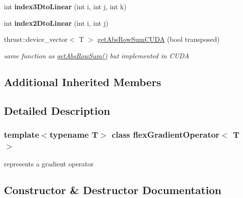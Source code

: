 \begin{DoxyCompactItemize}
\mbox{\label{classflex_gradient_operator_add0b4fb2eed25bc6386abd8219e516ff}} 
int {\bfseries index3\+Dto\+Linear} (int i, int j, int k)
\item 
\mbox{\label{classflex_gradient_operator_a3dcfa503fb5b55b1c9629399bfb79c0d}} 
int {\bfseries index2\+Dto\+Linear} (int i, int j)
\item 
thrust\+::device\+\_\+vector$<$ T $>$ \hyperlink{classflex_gradient_operator_ac5cf151db87946ac0f1864344db260d5}{get\+Abs\+Row\+Sum\+C\+U\+DA} (bool transposed)
\begin{DoxyCompactList}\small\item\em same function as \hyperlink{classflex_gradient_operator_a04950a1e57f7587b95824bfd82b35738}{get\+Abs\+Row\+Sum()} but implemented in C\+U\+DA \end{DoxyCompactList}\end{DoxyCompactItemize}
\subsection*{Additional Inherited Members}


\subsection{Detailed Description}
\subsubsection*{template$<$typename T$>$\newline
class flex\+Gradient\+Operator$<$ T $>$}

represents a gradient operator 

\subsection{Constructor \& Destructor Documentation}
\mbox{\label{classflex_gradient_operator_aa83ae15b09ba2195951d8df803f08705}} 
